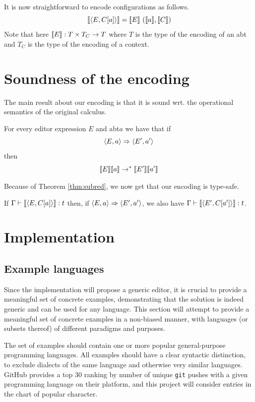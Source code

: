\documentclass[sigplan,review]{acmart}
\newcommand{\abt}{\textsf{abt}\xspace}
\begin{document}
It is now straightforward to encode configurations as follows.
%
\[ \llbracket \langle E, C[a] \rangle \rrbracket = \llbracket E \rrbracket \  (\llbracket a \rrbracket, \llbracket C \rrbracket) \]
%
Note that here $\llbracket E \rrbracket : T \times T_C \to T$ where $T$ is the type
of the encoding of an \abt and $T_C$ is the type of the encoding of a context.

\section{Soundness of the encoding}

The main result about our encoding is that it is sound wrt. the
operational semantics of the original calculus.

\begin{theorem}[Soundness] For every editor expression $E$ and \abt $a$
  we have that if
  \[ \langle E,a \rangle \stackrel{}{\Rightarrow} \langle E',a' \rangle \]
  then
  \[ \llbracket E \rrbracket\llbracket a \rrbracket \rightarrow^{\ast}  \llbracket E' \rrbracket\llbracket a' \rrbracket  \]
\end{theorem}

Because of Theorem \ref{thm:subred}, we now get that our encoding is
type-safe.

\begin{corollary}
  If $\Gamma \vdash \llbracket \langle E,C[a] \rangle \rrbracket : t$ then, if $\langle E,a \rangle
  \stackrel{}{\Rightarrow} \langle E',a' \rangle$, we also have $\Gamma \vdash \llbracket \langle E',C[a'] \rangle \rrbracket : t$.
\end{corollary}

\section{Implementation}

\subsection{Example languages}
Since the implementation will propose a generic editor, it is crucial to provide a meaningful set of concrete examples, demonstrating that the solution is indeed generic and can be used for any language.
This section will attempt to provide a meaningful set of concrete examples in a non-biased manner, with languages (or subsets thereof) of different paradigms and purposes.
 
The set of examples should contain one or more popular general-purpose programming languages.
All examples should have a clear syntactic distinction, to exclude dialects of the same language and otherwise very similar languages. \\ GitHub provides a top 30 ranking\cite{prog-lang-metrics} by number of unique \texttt{git} pushes with a given programming language on their platform, and this project will consider entries in the chart of popular character.
\end{document}
